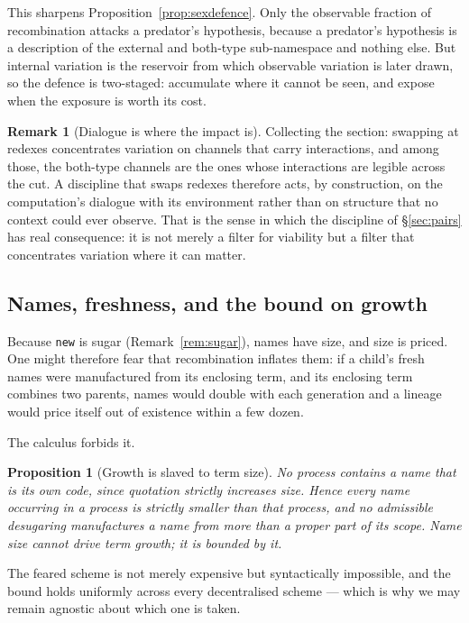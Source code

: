 \documentclass[11pt]{article}
\theoremstyle{plain}
\newtheorem{proposition}[theorem]{Proposition}
\theoremstyle{definition}
\newtheorem{remark}[theorem]{Remark}
\begin{document}
This sharpens Proposition~\ref{prop:sexdefence}. Only the observable fraction of recombination attacks
a predator's hypothesis, because a predator's hypothesis is a description of the external and
both-type sub-namespace and nothing else. But internal variation is the reservoir from which
observable variation is later drawn, so the defence is two-staged: accumulate where it cannot be seen,
and expose when the exposure is worth its cost.

\begin{remark}[Dialogue is where the impact is]
\label{rem:impact}
Collecting the section: swapping at redexes concentrates variation on channels that carry
interactions, and among those, the both-type channels are the ones whose interactions are legible
across the cut. A discipline that swaps redexes therefore acts, by construction, on the computation's
dialogue with its environment rather than on structure that no context could ever observe. That is the
sense in which the discipline of \S\ref{sec:pairs} has real consequence: it is not merely a filter for
viability but a filter that concentrates variation where it can matter.
\end{remark}

\subsection{Names, freshness, and the bound on growth}

Because \texttt{new} is sugar (Remark~\ref{rem:sugar}), names have size, and size is priced. One might
therefore fear that recombination inflates them: if a child's fresh names were manufactured from its
enclosing term, and its enclosing term combines two parents, names would double with each generation
and a lineage would price itself out of existence within a few dozen.

The calculus forbids it.

\begin{proposition}[Growth is slaved to term size]
\label{prop:namegrowth}
No process contains a name that is its own code, since quotation strictly increases size. Hence every
name occurring in a process is strictly smaller than that process, and no admissible desugaring
manufactures a name from more than a proper part of its scope. Name size cannot drive term growth; it
is bounded by it.
\end{proposition}

The feared scheme is not merely expensive but syntactically impossible, and the bound holds uniformly
across every decentralised scheme --- which is why we may remain agnostic about which one is taken.
\end{document}
